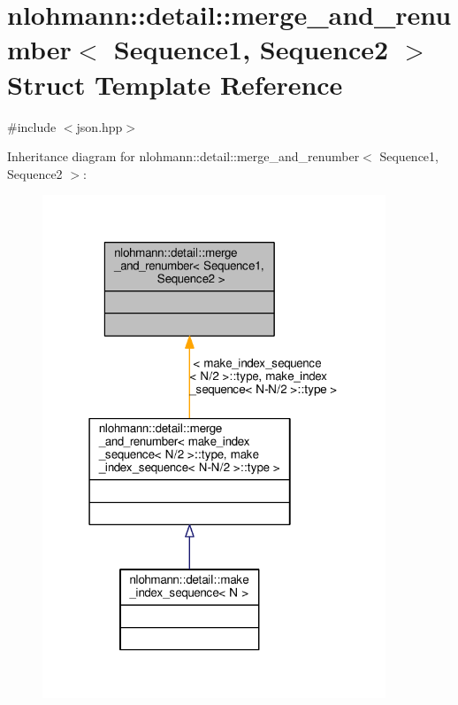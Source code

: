 \hypertarget{structnlohmann_1_1detail_1_1merge__and__renumber}{}\section{nlohmann\+:\+:detail\+:\+:merge\+\_\+and\+\_\+renumber$<$ Sequence1, Sequence2 $>$ Struct Template Reference}
\label{structnlohmann_1_1detail_1_1merge__and__renumber}


{\ttfamily \#include $<$json.\+hpp$>$}



Inheritance diagram for nlohmann\+:\+:detail\+:\+:merge\+\_\+and\+\_\+renumber$<$ Sequence1, Sequence2 $>$\+:
\nopagebreak
\begin{figure}[H]
\begin{center}
\leavevmode
\includegraphics[width=291pt]{structnlohmann_1_1detail_1_1merge__and__renumber__inherit__graph}
\end{center}
\end{figure}


